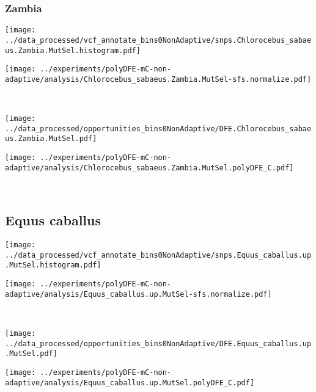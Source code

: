 \subsubsection{Zambia}

\begin{minipage}{0.49\linewidth}
    \texttt{[image: ../data\_processed/vcf\_annotate\_bins0NonAdaptive/snps.Chlorocebus\_sabaeus.Zambia.MutSel.histogram.pdf]}
\end{minipage}
\begin{minipage}{0.49\linewidth}
    \texttt{[image: ../experiments/polyDFE-mC-non-adaptive/analysis/Chlorocebus\_sabaeus.Zambia.MutSel-sfs.normalize.pdf]}
\end{minipage}
\\
\begin{minipage}{0.49\linewidth}
    \texttt{[image: ../data\_processed/opportunities\_bins0NonAdaptive/DFE.Chlorocebus\_sabaeus.Zambia.MutSel.pdf]}
\end{minipage}
\begin{minipage}{0.49\linewidth}
    \texttt{[image: ../experiments/polyDFE-mC-non-adaptive/analysis/Chlorocebus\_sabaeus.Zambia.MutSel.polyDFE\_C.pdf]}
\end{minipage}
\\

\subsection{Equus caballus}

\begin{minipage}{0.49\linewidth}
    \texttt{[image: ../data\_processed/vcf\_annotate\_bins0NonAdaptive/snps.Equus\_caballus.up.MutSel.histogram.pdf]}
\end{minipage}
\begin{minipage}{0.49\linewidth}
    \texttt{[image: ../experiments/polyDFE-mC-non-adaptive/analysis/Equus\_caballus.up.MutSel-sfs.normalize.pdf]}
\end{minipage}
\\
\begin{minipage}{0.49\linewidth}
    \texttt{[image: ../data\_processed/opportunities\_bins0NonAdaptive/DFE.Equus\_caballus.up.MutSel.pdf]}
\end{minipage}
\begin{minipage}{0.49\linewidth}
    \texttt{[image: ../experiments/polyDFE-mC-non-adaptive/analysis/Equus\_caballus.up.MutSel.polyDFE\_C.pdf]}
\end{minipage}
\\

